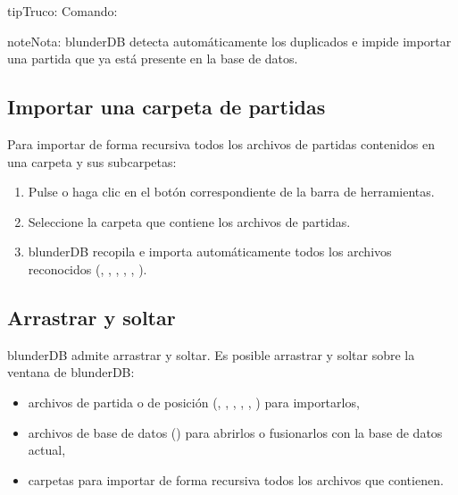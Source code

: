 \documentclass[letterpaper,10pt,spanish]{sphinxmanual}
\begin{document}
\begin{sphinxadmonition}{tip}{Truco:}
\sphinxAtStartPar
Comando: 
\end{sphinxadmonition}

\begin{sphinxadmonition}{note}{Nota:}
\sphinxAtStartPar
blunderDB detecta automáticamente los duplicados e impide importar una partida que ya está presente en la base de datos.
\end{sphinxadmonition}


\subsection{Importar una carpeta de partidas}
\label{\detokenize{guide_utilisateur:importer-un-dossier-de-matchs}}
\sphinxAtStartPar
Para importar de forma recursiva todos los archivos de partidas contenidos en una carpeta y sus subcarpetas:
\begin{enumerate}
%
\item {} 
\sphinxAtStartPar
Pulse  o haga clic en el botón correspondiente de la barra de herramientas.

\item {} 
\sphinxAtStartPar
Seleccione la carpeta que contiene los archivos de partidas.

\item {} 
\sphinxAtStartPar
blunderDB recopila e importa automáticamente todos los archivos reconocidos (, , , , , ).

\end{enumerate}


\subsection{Arrastrar y soltar}
\label{\detokenize{guide_utilisateur:glisser-deposer}}
\sphinxAtStartPar
blunderDB admite arrastrar y soltar. Es posible arrastrar y soltar sobre la ventana de blunderDB:
\begin{itemize}
\item {} 
\sphinxAtStartPar
archivos de partida o de posición (, , , , , ) para importarlos,

\item {} 
\sphinxAtStartPar
archivos de base de datos () para abrirlos o fusionarlos con la base de datos actual,

\item {} 
\sphinxAtStartPar
carpetas para importar de forma recursiva todos los archivos que contienen.

\end{itemize}
\end{document}
